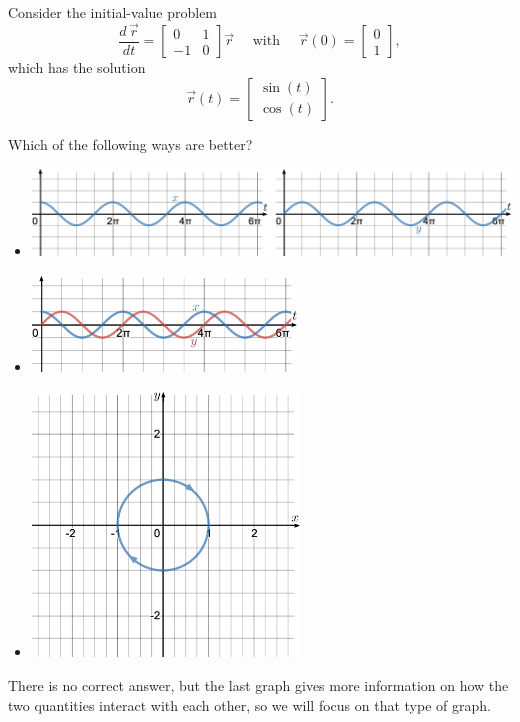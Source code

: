 \begin{example}
Consider the initial-value problem
$$
\frac{d\,\vec{r}}{dt} = \begin{bmatrix} 0 & 1 \\ -1 & 0 \end{bmatrix}\vec{r} \quad \text{ with } \quad \vec{r}(0)=\begin{bmatrix} 0 \\ 1 \end{bmatrix},
$$
which has the solution
$$
\vec{r}(t) = \begin{bmatrix}
	\sin(t) \\ \cos(t)
\end{bmatrix}.
$$

Which of the following ways are better?
\begin{itemize}
\item \begin{minipage}{400pt}\includegraphics[width=400pt]{images/module18-sep-xy.pdf}\end{minipage}

\item \begin{minipage}{200pt}\includegraphics*[width=200pt]{images/module18-together-xy.pdf}\end{minipage}

\item \begin{minipage}{200pt}\includegraphics[height=200pt]{images/module18-phaseportrait.pdf}\end{minipage}
\end{itemize}

There is no correct answer, but the last graph gives more information on how the two quantities interact with each other, so we will focus on that type of graph.
\end{example}


